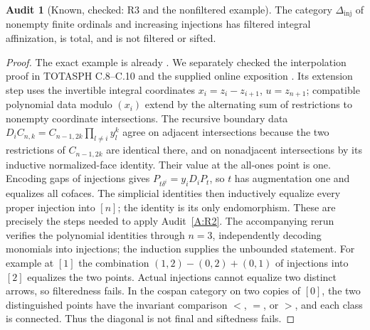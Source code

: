 \documentclass[11pt,a4paper]{article}
\newcommand{\Dinj}{\Delta_{\mathrm{inj}}}
\theoremstyle{definition}
\newtheorem{audit}[theorem]{Audit}
\begin{document}
\begin{audit}[Known, checked: R3 and the nonfiltered example]\label{A:R3}
The category $\Dinj$ of nonempty finite ordinals and increasing injections has filtered integral affinization, is total, and is not filtered or sifted.
\end{audit}
\begin{proof}
The exact example is already \citet[Theorem 3, pp.~995--996]{IsbellMitchell1973}. We separately checked the interpolation proof in TOTASPH C.8--C.10 and the supplied online exposition \citep{OpenMaths2026}. Its extension step uses the invertible integral coordinates $x_i=z_i-z_{i+1}$, $u=z_{n+1}$; compatible polynomial data modulo $(x_i)$ extend by the alternating sum of restrictions to nonempty coordinate intersections. The recursive boundary data $D_iC_{n,k}=C_{n-1,2k}\prod_{l\ne i}y_l^k$ agree on adjacent intersections because the two restrictions of $C_{n-1,2k}$ are identical there, and on nonadjacent intersections by its inductive normalized-face identity. Their value at the all-ones point is one. Encoding gaps of injections gives $P_{t\delta^i}=y_iD_iP_t$, so $t$ has augmentation one and equalizes all cofaces. The simplicial identities then inductively equalize every proper injection into $[n]$; the identity is its only endomorphism. These are precisely the steps needed to apply Audit~\ref{A:R2}. The accompanying rerun verifies the polynomial identities through $n=3$, independently decoding monomials into injections; the induction supplies the unbounded statement. For example at $[1]$ the combination $(1,2)-(0,2)+(0,1)$ of injections into $[2]$ equalizes the two points. Actual injections cannot equalize two distinct arrows, so filteredness fails. In the cospan category on two copies of $[0]$, the two distinguished points have the invariant comparison $<$, $=$, or $>$, and each class is connected. Thus the diagonal is not final and siftedness fails.
\end{proof}
\end{document}
